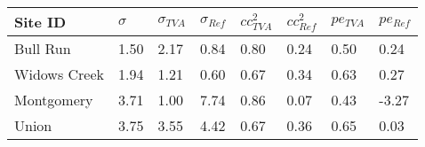 \begin{tabular}{llllllll}
\toprule
Site ID & $\sigma$ & $\sigma_{TVA}$ & $\sigma_{Ref}$ & $cc^2_{TVA}$ & $cc^2_{Ref}$ & $pe_{TVA}$ & $pe_{Ref}$ \\
\midrule
Bull Run & 1.50 & 2.17 & 0.84 & 0.80 & 0.24 & 0.50 & 0.24 \\
Widows Creek & 1.94 & 1.21 & 0.60 & 0.67 & 0.34 & 0.63 & 0.27 \\
Montgomery & 3.71 & 1.00 & 7.74 & 0.86 & 0.07 & 0.43 & -3.27 \\
Union & 3.75 & 3.55 & 4.42 & 0.67 & 0.36 & 0.65 & 0.03 \\
\bottomrule
\end{tabular}
